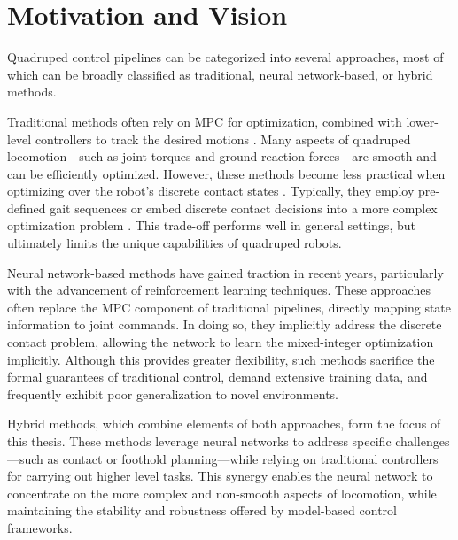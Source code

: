 \section{Motivation and Vision}

Quadruped control pipelines can be categorized into several
approaches, most of which can be broadly classified as traditional,
neural network-based, or hybrid methods.

Traditional methods often rely on MPC for
optimization, combined with lower-level controllers to track the
desired motions \cite{Kim2019highly-dynamic}. Many aspects of
quadruped locomotion—such as joint
torques and ground reaction forces—are smooth and can be efficiently
optimized. However, these methods become less practical when
optimizing over the robot's discrete contact states
\cite{Geisert2019contact-planning}.
Typically, they
employ pre-defined gait sequences \cite{Chai2022survey,
Fan2024survey} or embed discrete contact decisions
into a more complex optimization problem \cite{winkler_gait_2018}.
This trade-off performs well
in general settings, but ultimately limits the unique capabilities of
quadruped robots.

Neural network-based methods have gained traction in recent years,
particularly with the advancement of reinforcement learning
techniques. These approaches often replace the MPC component of
traditional pipelines, directly mapping state information to joint
commands. In doing so, they implicitly address the discrete contact
problem, allowing the network to learn the mixed-integer optimization
implicitly. Although this provides greater flexibility, such methods
sacrifice the formal guarantees of traditional control, demand
extensive training data, and frequently exhibit poor generalization
to novel environments.

Hybrid methods, which combine elements of both approaches, form the
focus of this thesis. These methods leverage neural networks to
address specific challenges—such as contact or foothold
planning—while relying on traditional controllers for carrying out
higher level tasks. This synergy enables the neural network to
concentrate on the more complex and non-smooth aspects of
locomotion, while maintaining the stability and robustness offered
by model-based control frameworks.
